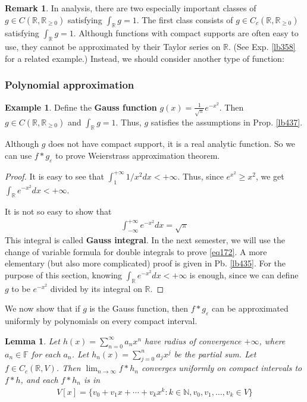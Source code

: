\documentclass[12pt,b5paper,notitlepage]{article}
\theoremstyle{definition}
\newtheorem{eg}[df]{Example}
\newtheorem{rem}[df]{Remark}
\theoremstyle{plain}
\newtheorem{lm}[df]{Lemma}
\newcommand{\Nbb}{\mathbb N}
\newcommand{\Rbb}{\mathbb R}
\newcommand{\Fbb}{\mathbb F}
\newcommand{\dps}{\displaystyle}
\newcommand{\eps}{\varepsilon}
\numberwithin{equation}{section}
\begin{document}
\begin{rem}
In analysis, there are two especially important classes of  $g\in C(\Rbb,\Rbb_{\geq0})$ satisfying $\int_\Rbb g=1$. The first class consists of $g\in C_c(\Rbb,\Rbb_{\geq0})$ satisfying $\int_\Rbb g=1$. Although functions with compact supports are often easy to use, they cannot be approximated by their Taylor series on $\Rbb$. (See Exp. \ref{lb358} for a related example.) Instead, we should consider another type of function:
\end{rem}


\subsubsection{Polynomial approximation}



\begin{eg}
Define the \textbf{Gauss function} $\dps g(x)=\frac 1{\sqrt\pi}e^{-x^2}$.  Then $g\in C(\Rbb,\Rbb_{\geq0})$ and $\int_\Rbb g=1$. Thus, $g$ satisfies the assumptions in Prop. \ref{lb437}. 
\end{eg}

Although $g$ does not have compact support, it is a real analytic function. So we can use $f*g_\eps$ to prove Weierstrass approximation theorem.

\begin{proof}
It is easy to see that $\int_1^{+\infty}1/x^2dx<+\infty$. Thus, since $e^{x^2}\geq x^2$, we get $\int_\Rbb e^{-x^2}dx<+\infty$.

It is not so easy to show that 
\begin{align} \label{eq172}
\int_{-\infty}^{+\infty}e^{-x^2}dx=\sqrt\pi
\end{align}
This integral is called  \textbf{Gauss integral}.  In the next semester, we will use the change of variable formula for double integrals to prove \eqref{eq172}.
A more elementary (but also more complicated) proof is given in Pb. \ref{lb435}. For the purpose of this section, knowing $\int_\Rbb e^{-x^2}dx<+\infty$ is enough, since we can define $g$ to be $e^{-x^2}$ divided by its integral on $\Rbb$.
\end{proof}



We now show that if $g$ is the Gauss function, then $f*g_\eps$ can be approximated uniformly by polynomials on every compact interval. 

\begin{lm}\label{lb438}
Let $h(x)=\sum_{n=0}^\infty a_nx^n$ have radius of convergence $+\infty$, where $a_n\in\Fbb$ for each $a_n$. Let $h_n(x)=\sum_{j=0}^n a_jx^j$ be the partial sum. Let $f\in C_c(\Rbb,V)$. Then $\lim_{n\rightarrow\infty}f*h_n$ converges uniformly on compact intervals to $f*h$, and each $f*h_n$ is in 
\begin{align}
V[x]=\{v_0+v_1x+\cdots+v_kx^k:k\in\Nbb,v_0,v_1,\dots,v_k\in V\}
\end{align}
\end{lm}
\end{document}
